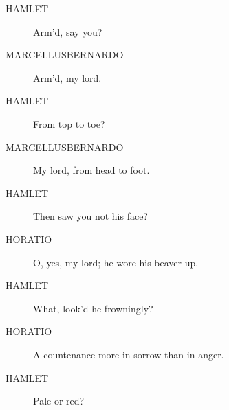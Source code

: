 \documentclass{article}
\begin{document}
\begin{description}
            
\item[HAMLET] Arm'd, say you?
\end{description}
          
\begin{description}
            
\item[MARCELLUSBERNARDO] Arm'd, my lord.
\end{description}
          
\begin{description}
            
\item[HAMLET] From top to toe?
\end{description}
          
\begin{description}
            
\item[MARCELLUSBERNARDO] My lord, from head to foot.
\end{description}
          
\begin{description}
            
\item[HAMLET] Then saw you not his face?
\end{description}
          
\begin{description}
            
\item[HORATIO] O, yes, my lord; he wore his beaver up.
\end{description}
          
\begin{description}
            
\item[HAMLET] What, look'd he frowningly?
\end{description}
          
\begin{description}
            
\item[HORATIO] A countenance more in sorrow than in anger.
\end{description}
          
\begin{description}
            
\item[HAMLET] Pale or red?
\end{description}
          
\end{document}
